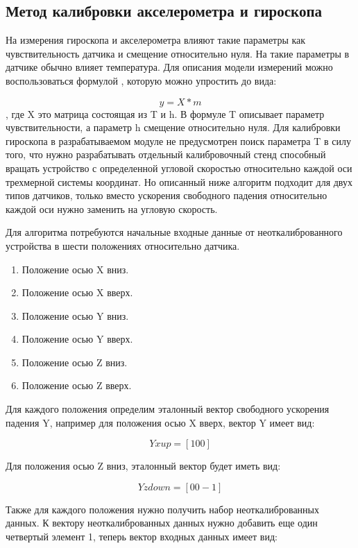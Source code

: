 
\subsection{Метод калибровки акселерометра и гироскопа}

На измерения гироскопа и акселерометра влияют такие параметры как чувствительность датчика и смещение относительно нуля.
На такие параметры в датчике обычно влияет температура.
Для описания модели измерений можно воспользоваться формулой %
, которую можно упростить до вида:

$$ y = X*m $$
, где X это матрица состоящая из T и h.
В формуле T описывает параметр чувствительности, а параметр h смещение относительно нуля.
Для калибровки гироскопа в разрабатываемом модуле не предусмотрен поиск параметра T в силу того, 
что нужно разрабатывать отдельный калибровочный стенд способный вращать устройство с определенной 
угловой скоростью относительно каждой оси трехмерной системы координат. Но описанный ниже алгоритм подходит для двух типов датчиков, 
только вместо ускорения свободного падения относительно каждой оси нужно заменить на угловую скорость.

Для алгоритма потребуются начальные входные данные от неоткалиброванного устройства в шести положениях относительно датчика.
\begin{enumerate}
    \item Положение осью X вниз.
    \item Положение осью X вверх.
    \item Положение осью Y вниз.
    \item Положение осью Y вверх.
    \item Положение осью Z вниз.
    \item Положение осью Z вверх.
\end{enumerate}

Для каждого положения определим эталонный вектор свободного ускорения падения Y, например для положения осью X вверх, вектор Y имеет вид:

$$ Yxup = [1 0 0] $$

Для положения осью Z вниз, эталонный вектор будет иметь вид:

$$ Yzdown = [0 0 -1] $$

Также для каждого положения нужно получить набор неоткалиброванных данных. 
К вектору неоткалиброванных данных нужно добавить еще один четвертый элемент 1, теперь вектор входных данных имеет вид:

